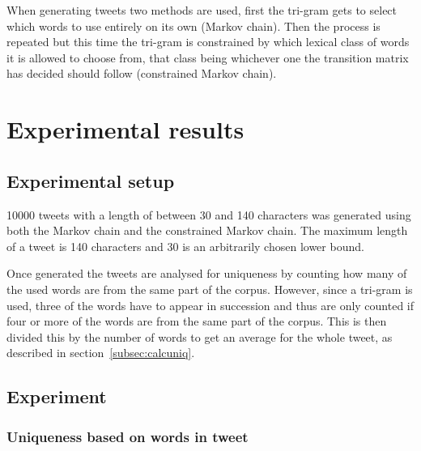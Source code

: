 \documentclass[a4paper,12pt]{article}
\begin{document}
When generating tweets two methods are used, first the tri-gram gets to select which words to use entirely on its own (Markov chain). Then the process is repeated but this time the tri-gram is constrained by which lexical class of words it is allowed to choose from, that class being whichever one the transition matrix has decided should follow (constrained Markov chain).

\section{Experimental results}
\label{sec:exps}

\subsection{Experimental setup}
10000 tweets with a length of between 30 and 140 characters was generated using both the Markov chain and the constrained Markov chain.
The maximum length of a tweet is 140 characters and 30 is an arbitrarily chosen lower bound.

Once generated the tweets are analysed for uniqueness by counting how many of the used words are from the same part of the corpus. However, since a tri-gram is used, three of the words have to appear in succession and thus are only counted if four or more of the words are from the same part of the corpus. This is then divided this by the number of words to get an average for the whole tweet, as described in section~\ref{subsec:calcuniq}.

\newpage
\subsection{Experiment}

\subsubsection{Uniqueness based on words in tweet}
\end{document}
